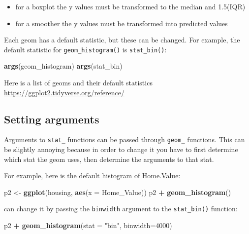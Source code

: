 \documentclass[]{book}
\newenvironment{Shaded}{\begin{snugshade}}{\end{snugshade}}
\newcommand{\KeywordTok}[1]{\textcolor[rgb]{0.13,0.29,0.53}{\textbf{#1}}}
\newcommand{\DataTypeTok}[1]{\textcolor[rgb]{0.13,0.29,0.53}{#1}}
\newcommand{\DecValTok}[1]{\textcolor[rgb]{0.00,0.00,0.81}{#1}}
\newcommand{\StringTok}[1]{\textcolor[rgb]{0.31,0.60,0.02}{#1}}
\newcommand{\OperatorTok}[1]{\textcolor[rgb]{0.81,0.36,0.00}{\textbf{#1}}}
\newcommand{\NormalTok}[1]{#1}
\providecommand{\tightlist}{%
  \setlength{\itemsep}{0pt}\setlength{\parskip}{0pt}}
\begin{document}
\begin{itemize}
\tightlist
\item
  for a boxplot the y values must be transformed to the median and
  1.5(IQR)
\item
  for a smoother the y values must be transformed into predicted values
\end{itemize}

Each geom has a default statistic, but these can be changed. For
example, the default statistic for \texttt{geom\_histogram()} is
\texttt{stat\_bin()}:

\begin{Shaded}
\begin{Highlighting}[]
\KeywordTok{args}\NormalTok{(geom_histogram)}
\KeywordTok{args}\NormalTok{(stat_bin)}
\end{Highlighting}
\end{Shaded}

Here is a list of geoms and their default statistics
\url{https://ggplot2.tidyverse.org/reference/}

\subsection{Setting arguments}\label{setting-arguments}

Arguments to \texttt{stat\_} functions can be passed through
\texttt{geom\_} functions. This can be slightly annoying because in
order to change it you have to first determine which stat the geom uses,
then determine the arguments to that stat.

For example, here is the default histogram of Home.Value:

\begin{Shaded}
\begin{Highlighting}[]
\NormalTok{p2 <-}\StringTok{ }\KeywordTok{ggplot}\NormalTok{(housing, }\KeywordTok{aes}\NormalTok{(}\DataTypeTok{x =}\NormalTok{ Home_Value))}
\NormalTok{p2 }\OperatorTok{+}\StringTok{ }\KeywordTok{geom_histogram}\NormalTok{()}
\end{Highlighting}
\end{Shaded}

can change it by passing the \texttt{binwidth} argument to the
\texttt{stat\_bin()} function:

\begin{Shaded}
\begin{Highlighting}[]
\NormalTok{p2 }\OperatorTok{+}\StringTok{ }\KeywordTok{geom_histogram}\NormalTok{(}\DataTypeTok{stat =} \StringTok{"bin"}\NormalTok{, }\DataTypeTok{binwidth=}\DecValTok{4000}\NormalTok{)}
\end{Highlighting}
\end{Shaded}
\end{document}
